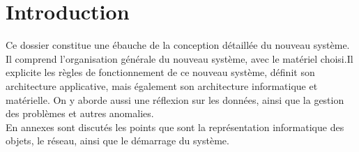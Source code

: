 \section{Introduction}
Ce dossier constitue une ébauche de la conception
détaillée du nouveau système. Il comprend l'organisation
générale du nouveau système, avec le matériel choisi.Il
explicite les règles de fonctionnement de ce nouveau système,
définit son architecture applicative, mais également son
architecture informatique et matérielle. On y aborde aussi
une réflexion sur les données, ainsi que la gestion des problèmes
et autres anomalies. \\
En annexes sont discutés les points que sont la représentation
informatique des objets, le réseau, ainsi que le démarrage du système.
